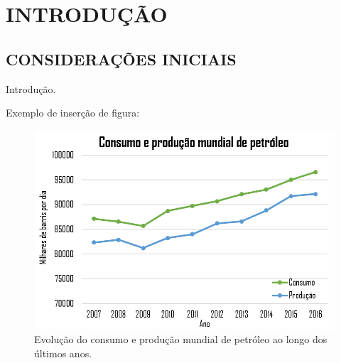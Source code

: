 
\chapter{INTRODUÇÃO}
\label{chap:introducao}

\section{CONSIDERAÇÕES INICIAIS}

Introdução.

Exemplo de inserção de figura:

\begin{figure}[h]
	\centering
	\includegraphics[width=.7\textwidth]{dados/figuras/grafico-anp.png}
	\caption{Evolução do consumo e produção mundial de petróleo ao longo dos últimos anos.}
	\label{fig:grafico-anp}
\end{figure}
